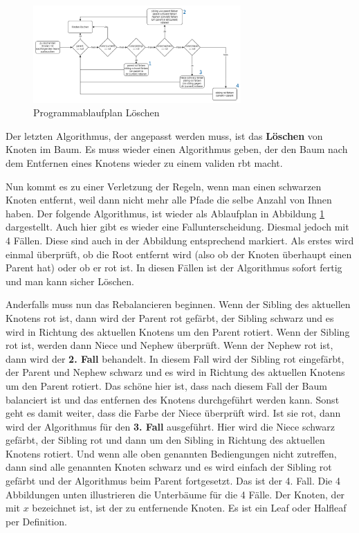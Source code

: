 \documentclass[11pt]{article}
\begin{document}
\begin{figure}
  \centering
  \includegraphics[width=300px]{prog2.png}
  \caption{Programmablaufplan Löschen}
  \label{del-tr}
\end{figure}

Der letzten Algorithmus, der angepasst werden muss, ist das \textbf{Löschen} von Knoten im Baum. Es muss wieder einen Algorithmus geben, 
der den Baum nach dem Entfernen eines Knotens wieder zu einem validen \gls{rbt} macht. 

Nun kommt es zu einer Verletzung der Regeln, wenn man einen schwarzen Knoten entfernt, weil dann nicht mehr alle Pfade die selbe Anzahl von Ihnen haben. 
Der folgende Algorithmus, ist wieder als Ablaufplan in Abbildung \ref{del-tr} dargestellt. 
Auch hier gibt es wieder eine Fallunterscheidung. Diesmal jedoch mit 4 Fällen. Diese sind auch in der Abbildung entsprechend markiert.
Als erstes wird einmal überprüft, ob die Root entfernt wird (also ob der Knoten überhaupt einen Parent hat) oder ob er rot ist. In diesen Fällen ist der Algorithmus sofort fertig und man kann sicher Löschen.

Anderfalls muss nun das Rebalancieren beginnen. Wenn der Sibling des aktuellen Knotens rot ist, dann wird der Parent rot gefärbt, der Sibling schwarz und es wird in Richtung des aktuellen Knotens um den Parent rotiert.
Wenn der Sibling rot ist, werden dann Niece und Nephew überprüft.
Wenn der Nephew rot ist, dann wird der \textbf{2. Fall} behandelt. In diesem Fall wird der Sibling rot eingefärbt, der Parent und Nephew schwarz und es wird in Richtung des aktuellen Knotens um den Parent rotiert.
Das schöne hier ist, dass nach diesem Fall der Baum balanciert ist und das entfernen des Knotens durchgeführt werden kann.
Sonst geht es damit weiter, dass die Farbe der Niece überprüft wird. Ist sie rot, dann wird der Algorithmus für den \textbf{3. Fall} ausgeführt. Hier wird die Niece schwarz gefärbt, der Sibling rot und dann um den Sibling in Richtung des aktuellen Knotens rotiert.
Und wenn alle oben genannten Bediengungen nicht zutreffen, dann sind alle genannten Knoten schwarz und es wird einfach der Sibling rot gefärbt und der Algorithmus beim Parent fortgesetzt. Das ist der 4. Fall.
Die 4 Abbildungen unten illustrieren die Unterbäume für die 4 Fälle. Der Knoten, der mit $x$ bezeichnet ist, ist der zu entfernende Knoten. Es ist ein Leaf oder Halfleaf per Definition. 
\end{document}
